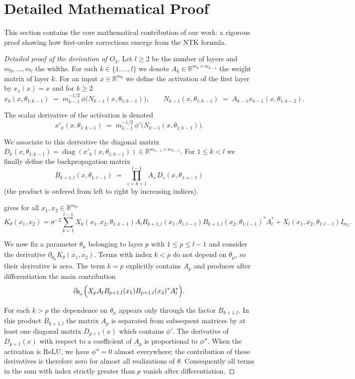 \documentclass[11pt,a4paper]{article}
\theoremstyle{definition}
\begin{document}
\newpage

\section{Detailed Mathematical Proof}

This section contains the core mathematical contribution of our work: a rigorous proof showing how first-order corrections emerge from the NTK formula.

\begin{proof}[Detailed proof of the derivation of $O_3$]\label{proof:main}
Let $l \ge 2$ be the number of layers and $m_0,\dots ,m_l$ the widths. For each $k\in\{1,\dots ,l\}$ we denote $A_k\in \mathbb R^{m_k\times m_{k-1}}$ the weight matrix of layer $k$. For an input $x\in\mathbb R^{m_0}$ we define the activation of the first layer by $x_1(x)=x$ and for $k\ge 2$
\[
 x_k(x,\theta_{1:k-1})\;=\;m_{k-1}^{-1/2}\,\phi\bigl(N_{k-1}(x,\theta_{1:k-1})\bigr),\qquad N_{k-1}(x,\theta_{1:k-1})\;=\;A_{k-1}x_{k-1}(x,\theta_{1:k-2}).
\]

The scalar derivative of the activation is denoted
\[
 x'_k(x,\theta_{1:k-1})\;=\;m_{k-1}^{-1/2}\,\phi'\bigl(N_{k-1}(x,\theta_{1:k-1})\bigr).
\]

We associate to this derivative the diagonal matrix $D_k(x,\theta_{1:k-1})=\operatorname{diag}(x'_k(x,\theta_{1:k-1}))\in \mathbb R^{m_{k-1}\times m_{k-1}}$. For $1\le k<l$ we finally define the backpropagation matrix
\[
 B_{k+1,l}(x,\theta_{1:l-1})\;=\;\prod_{s=k+1}^{l-1} A_s\,D_{s}(x,\theta_{1:s-1})
\]
(the product is ordered from left to right by increasing indices).

 gives for all $x_1,x_2\in\mathbb R^{m_0}$
\[
 K_{\theta}(x_1,x_2)=\sigma^{-2}\sum_{k=1}^{l-1} X_k(x_1,x_2,\theta_{1:k-1})A_l B_{k+1,l}(x_1,\theta_{1:l-1})B_{k+1,l}(x_2,\theta_{1:l-1})^{*}A_l^{*}+X_l(x_1,x_2,\theta_{1:l-1})I_{m_l}.
\]

We now fix a parameter $\theta_{\mu}$ belonging to layer $p$ with $1\le p\le l-1$ and consider the derivative $\partial_{\theta_{\mu}}K_{\theta}(x_1,x_2)$. Terms with index $k<p$ do not depend on $\theta_{\mu}$, so their derivative is zero. The term $k=p$ explicitly contains $A_p$ and produces after differentiation the main contribution
\[
 \partial_{\theta_{\mu}}\Bigl( X_p A_l B_{p+1,l}(x_1)B_{p+1,l}(x_2)^{*}A_l^{*}\Bigr).
\]

For each $k>p$ the dependence on $\theta_{\mu}$ appears only through the factor $B_{k+1,l}$. In this product $B_{k+1,l}$ the matrix $A_p$ is separated from subsequent matrices by at least one diagonal matrix $D_{p+1}(x)$ which contains $\phi'$. The derivative of $D_{p+1}(x)$ with respect to a coefficient of $A_p$ is proportional to $\phi''$. When the activation is ReLU, we have $\phi''=0$ almost everywhere; the contribution of these derivatives is therefore zero for almost all realizations of $\theta$. Consequently all terms in the sum with index strictly greater than $p$ vanish after differentiation.


\end{proof}
\end{document}
